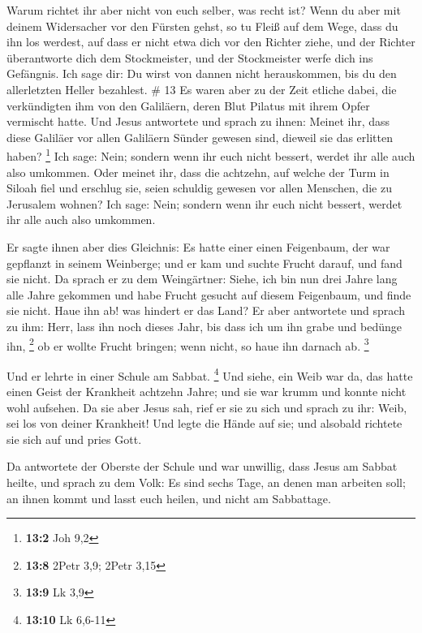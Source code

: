  Warum richtet ihr aber nicht von euch selber, was recht
ist?  Wenn du aber mit deinem Widersacher vor den Fürsten
gehst, so tu Fleiß auf dem Wege, dass du ihn los werdest, auf dass er
nicht etwa dich vor den Richter ziehe, und der Richter überantworte dich
dem Stockmeister, und der Stockmeister werfe dich ins Gefängnis.
 Ich sage dir: Du wirst von dannen nicht herauskommen,
bis du den allerletzten Heller bezahlest. \# 13  Es waren
aber zu der Zeit etliche dabei, die verkündigten ihm von den Galiläern,
deren Blut Pilatus mit ihrem Opfer vermischt hatte.  Und
Jesus antwortete und sprach zu ihnen: Meinet ihr, dass diese Galiläer
vor allen Galiläern Sünder gewesen sind, dieweil sie das erlitten haben?
\footnote{\textbf{13:2} Joh 9,2}  Ich sage: Nein; sondern
wenn ihr euch nicht bessert, werdet ihr alle auch also umkommen.
 Oder meinet ihr, dass die achtzehn, auf welche der Turm
in Siloah fiel und erschlug sie, seien schuldig gewesen vor allen
Menschen, die zu Jerusalem wohnen?  Ich sage: Nein;
sondern wenn ihr euch nicht bessert, werdet ihr alle auch also umkommen.

 Er sagte ihnen aber dies Gleichnis: Es hatte einer einen
Feigenbaum, der war gepflanzt in seinem Weinberge; und er kam und suchte
Frucht darauf, und fand sie nicht.  Da sprach er zu dem
Weingärtner: Siehe, ich bin nun drei Jahre lang alle Jahre gekommen und
habe Frucht gesucht auf diesem Feigenbaum, und finde sie nicht. Haue ihn
ab! was hindert er das Land?  Er aber antwortete und
sprach zu ihm: Herr, lass ihn noch dieses Jahr, bis dass ich um ihn
grabe und bedünge ihn, \footnote{\textbf{13:8} 2Petr 3,9; 2Petr 3,15}
 ob er wollte Frucht bringen; wenn nicht, so haue ihn
darnach ab. \footnote{\textbf{13:9} Lk 3,9}

 Und er lehrte in einer Schule am Sabbat. \footnote{\textbf{13:10}
  Lk 6,6-11}  Und siehe, ein Weib war da, das hatte einen
Geist der Krankheit achtzehn Jahre; und sie war krumm und konnte nicht
wohl aufsehen.  Da sie aber Jesus sah, rief er sie zu
sich und sprach zu ihr: Weib, sei los von deiner Krankheit!
 Und legte die Hände auf sie; und alsobald richtete sie
sich auf und pries Gott.

 Da antwortete der Oberste der Schule und war unwillig,
dass Jesus am Sabbat heilte, und sprach zu dem Volk: Es sind sechs Tage,
an denen man arbeiten soll; an ihnen kommt und lasst euch heilen, und
nicht am Sabbattage.

